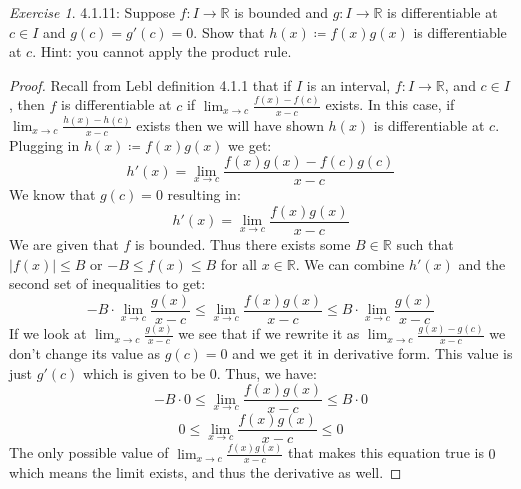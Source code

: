\documentclass[12pt,oneside]{amsart}
\theoremstyle{definition}
\theoremstyle{remark}
\newtheorem{exer}{Exercise}
\numberwithin{equation}{exer}
\begin{document}
\newpage
\begin{exer}
4.1.11: Suppose $f:I \rightarrow \mathbb{R}$ is bounded and $g:I \rightarrow \mathbb{R}$ is differentiable at $c \in I$ and $g(c)=g'(c)=0$. Show that $h(x) \coloneqq f(x)g(x)$ is differentiable at $c$. Hint: you cannot apply the product rule.
\end{exer}
\begin{proof}
Recall from Lebl definition 4.1.1 that if $I$ is an interval, $f:I\rightarrow \mathbb{R}$, and $c\in I$, then $f$ is differentiable at $c$ if $\lim_{x \to c} \frac{f(x)-f(c)}{x-c}$ exists. In this case, if $\lim_{x \to c}\frac{h(x)-h(c)}{x-c}$ exists then we will have shown $h(x)$ is differentiable at $c$. Plugging in $h(x) \coloneqq f(x)g(x)$ we get:
$$h'(x)=\lim_{x \to c} \frac{f(x)g(x)-f(c)g(c)}{x-c}$$
We know that $g(c)=0$ resulting in:
$$h'(x)=\lim_{x \to c} \frac{f(x)g(x)}{x-c}$$
We are given that $f$ is bounded. Thus there exists some $B \in \mathbb{R}$ such that $|f(x)| \leq B$ or $-B \leq f(x) \leq B$ for all $x \in \mathbb{R}$. We can combine $h'(x)$ and the second set of inequalities to get:
$$-B \cdot \lim_{x \to c} \frac{g(x)}{x-c} \leq \lim_{x \to c} \frac{f(x)g(x)}{x-c} \leq B \cdot \lim_{x \to c} \frac{g(x)}{x-c}$$
If we look at $\lim_{x \to c} \frac{g(x)}{x-c}$ we see that if we rewrite it as $\lim_{x \to c} \frac{g(x)-g(c)}{x-c}$ we don't change its value as $g(c)=0$ and we get it in derivative form. This value is just $g'(c)$ which is given to be $0$. Thus, we have:
$$-B \cdot 0 \leq \lim_{x \to c} \frac{f(x)g(x)}{x-c} \leq B \cdot 0$$
$$0 \leq \lim_{x \to c} \frac{f(x)g(x)}{x-c} \leq 0$$
The only possible value of $\lim_{x \to c} \frac{f(x)g(x)}{x-c}$ that makes this equation true is $0$ which means the limit exists, and thus the derivative as well.
\end{proof}
\end{document}
